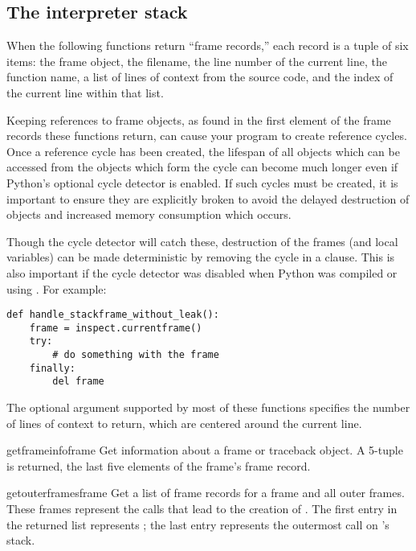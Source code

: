 \subsection{The interpreter stack
            \label{inspect-stack}}

When the following functions return ``frame records,'' each record
is a tuple of six items: the frame object, the filename,
the line number of the current line, the function name, a list of
lines of context from the source code, and the index of the current
line within that list.

\begin{notice}[warning]
Keeping references to frame objects, as found in
the first element of the frame records these functions return, can
cause your program to create reference cycles.  Once a reference cycle
has been created, the lifespan of all objects which can be accessed
from the objects which form the cycle can become much longer even if
Python's optional cycle detector is enabled.  If such cycles must be
created, it is important to ensure they are explicitly broken to avoid
the delayed destruction of objects and increased memory consumption
which occurs.

Though the cycle detector will catch these, destruction of the frames
(and local variables) can be made deterministic by removing the cycle
in a  clause.  This is also important if the cycle
detector was disabled when Python was compiled or using
.  For example:

\begin{verbatim}
def handle_stackframe_without_leak():
    frame = inspect.currentframe()
    try:
        # do something with the frame
    finally:
        del frame
\end{verbatim}
\end{notice}

The optional  argument supported by most of these
functions specifies the number of lines of context to return, which
are centered around the current line.

\begin{funcdesc}{getframeinfo}{frame}
  Get information about a frame or traceback object.  A 5-tuple
  is returned, the last five elements of the frame's frame record.
\end{funcdesc}

\begin{funcdesc}{getouterframes}{frame}
  Get a list of frame records for a frame and all outer frames.  These
  frames represent the calls that lead to the creation of .
  The first entry in the returned list represents ; the
  last entry represents the outermost call on 's stack.
\end{funcdesc}

